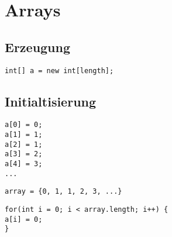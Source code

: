 



\newpage
\section{Arrays}

\subsection{Erzeugung}
\begin{lstlisting}[caption=Array Erzeugung]
int[] a = new int[length];
\end{lstlisting}

\subsection{Initialtisierung}
\begin{lstlisting}[caption=Array Initialisierung einzeln]
a[0] = 0; 
a[1] = 1; 
a[2] = 1; 
a[3] = 2; 
a[4] = 3; 
...
\end{lstlisting}
\begin{lstlisting}[caption=Array Initialisierung mit Liste]
array = {0, 1, 1, 2, 3, ...}
\end{lstlisting}
\begin{lstlisting}[caption=Array Initialisierung mit for Schleife]
for(int i = 0; i < array.length; i++) {
a[i] = 0;
}
\end{lstlisting}

